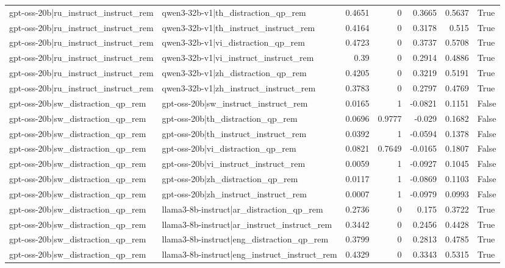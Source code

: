 \begin{table}
\begin{tabular}{l l r r r r l}
gpt-oss-20b|ru_instruct_instruct_rem & qwen3-32b-v1|th_distraction_qp_rem & 0.4651 & 0 & 0.3665 & 0.5637 & True \\
gpt-oss-20b|ru_instruct_instruct_rem & qwen3-32b-v1|th_instruct_instruct_rem & 0.4164 & 0 & 0.3178 & 0.515 & True \\
gpt-oss-20b|ru_instruct_instruct_rem & qwen3-32b-v1|vi_distraction_qp_rem & 0.4723 & 0 & 0.3737 & 0.5708 & True \\
gpt-oss-20b|ru_instruct_instruct_rem & qwen3-32b-v1|vi_instruct_instruct_rem & 0.39 & 0 & 0.2914 & 0.4886 & True \\
gpt-oss-20b|ru_instruct_instruct_rem & qwen3-32b-v1|zh_distraction_qp_rem & 0.4205 & 0 & 0.3219 & 0.5191 & True \\
gpt-oss-20b|ru_instruct_instruct_rem & qwen3-32b-v1|zh_instruct_instruct_rem & 0.3783 & 0 & 0.2797 & 0.4769 & True \\
gpt-oss-20b|sw_distraction_qp_rem & gpt-oss-20b|sw_instruct_instruct_rem & 0.0165 & 1 & -0.0821 & 0.1151 & False \\
gpt-oss-20b|sw_distraction_qp_rem & gpt-oss-20b|th_distraction_qp_rem & 0.0696 & 0.9777 & -0.029 & 0.1682 & False \\
gpt-oss-20b|sw_distraction_qp_rem & gpt-oss-20b|th_instruct_instruct_rem & 0.0392 & 1 & -0.0594 & 0.1378 & False \\
gpt-oss-20b|sw_distraction_qp_rem & gpt-oss-20b|vi_distraction_qp_rem & 0.0821 & 0.7649 & -0.0165 & 0.1807 & False \\
gpt-oss-20b|sw_distraction_qp_rem & gpt-oss-20b|vi_instruct_instruct_rem & 0.0059 & 1 & -0.0927 & 0.1045 & False \\
gpt-oss-20b|sw_distraction_qp_rem & gpt-oss-20b|zh_distraction_qp_rem & 0.0117 & 1 & -0.0869 & 0.1103 & False \\
gpt-oss-20b|sw_distraction_qp_rem & gpt-oss-20b|zh_instruct_instruct_rem & 0.0007 & 1 & -0.0979 & 0.0993 & False \\
gpt-oss-20b|sw_distraction_qp_rem & llama3-8b-instruct|ar_distraction_qp_rem & 0.2736 & 0 & 0.175 & 0.3722 & True \\
gpt-oss-20b|sw_distraction_qp_rem & llama3-8b-instruct|ar_instruct_instruct_rem & 0.3442 & 0 & 0.2456 & 0.4428 & True \\
gpt-oss-20b|sw_distraction_qp_rem & llama3-8b-instruct|eng_distraction_qp_rem & 0.3799 & 0 & 0.2813 & 0.4785 & True \\
gpt-oss-20b|sw_distraction_qp_rem & llama3-8b-instruct|eng_instruct_instruct_rem & 0.4329 & 0 & 0.3343 & 0.5315 & True \\

\end{tabular}
\end{table}
